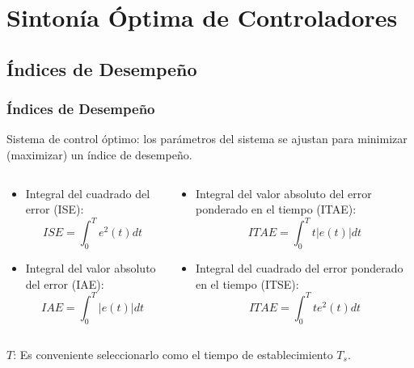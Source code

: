 \documentclass[aspectratio=169,handout]{beamer}
\theoremstyle{definition}
\theoremstyle{plain}
\theoremstyle{remark}
\begin{document}
\section{Sintonía Óptima de Controladores}
\subsection{Índices de Desempeño}
\begin{frame}[<+->]\frametitle{Índices de Desempeño}
	Sistema de control óptimo: los parámetros del sistema se ajustan para minimizar (maximizar) un índice de desempeño.
	\begin{columns}
	\begin{column}{0.5\textwidth}
	\begin{itemize}
		\item Integral del cuadrado del error (ISE):
		\begin{equation*}
			ISE = \int_0^T e^2(t) dt
		\end{equation*}
		\item Integral del valor absoluto del error (IAE):
		\begin{equation*}
			IAE = \int_0^T |e(t)| dt
		\end{equation*}
	\end{itemize}
	\end{column}	
	\begin{column}{0.5\textwidth}
	\begin{itemize}
		\item Integral del valor absoluto del error ponderado en el tiempo (ITAE):
		\begin{equation*}
			ITAE = \int_0^T t |e(t)| dt
		\end{equation*}
		\item Integral del cuadrado del error ponderado en el tiempo (ITSE):
		\begin{equation*}
			ITAE = \int_0^T t e^2(t) dt
		\end{equation*}
	\end{itemize}
	\end{column}	
	\end{columns}
	\vspace*{-5mm}
	$T$: Es conveniente seleccionarlo como el tiempo de establecimiento $T_s$.
\end{frame}
\end{document}
